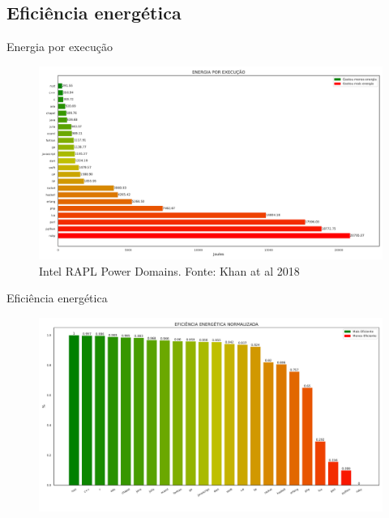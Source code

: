 \subsection{Eficiência energética}
\begin{frame}{Energia por execução}
    \begin{figure}
        \centering
        \includegraphics[width=0.85\linewidth]{images/energia_por_execucao.pdf}
        \caption{Intel RAPL Power Domains. Fonte: Khan at al 2018 \cite{khan2018IntelRapl}}
    \end{figure}
\end{frame}

\begin{frame}{Eficiência energética}
    \begin{figure}
        \centering
        \includegraphics[width=0.85\linewidth]{images/eficiencia_energetica.pdf}
    \end{figure}
\end{frame}

